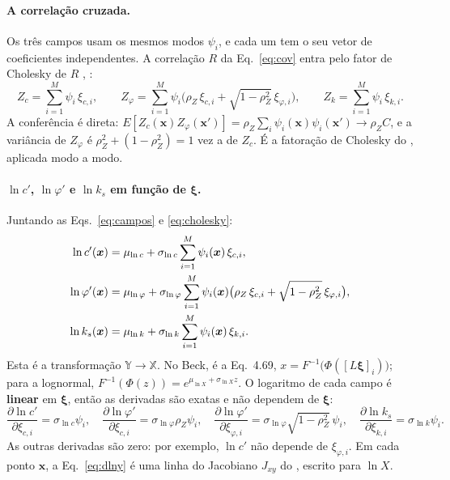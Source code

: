 \documentclass[11pt,a4paper]{article}
\newcommand{\X}{\mathbb{X}}
\newcommand{\Y}{\mathbb{Y}}
\newcommand{\xib}{\bm\xi}
\begin{document}
\paragraph{A correlação cruzada.} Os três campos usam os mesmos modos $\psi_i$, e cada um tem o seu vetor de
coeficientes independentes. A correlação $R$ da Eq.~\eqref{eq:cov} entra pelo fator de Cholesky de $R$
\citep[Eq.~11]{cho2010}, \citep{vorechovsky2008}:
\begin{equation}
  Z_c = \sum_{i=1}^M \psi_i\,\xi_{c,i}, \qquad
  Z_\varphi = \sum_{i=1}^M \psi_i\big(\rho_Z\,\xi_{c,i} + \sqrt{1 - \rho_Z^2}\,\xi_{\varphi,i}\big), \qquad
  Z_k = \sum_{i=1}^M \psi_i\,\xi_{k,i}.
  \label{eq:cholesky}
\end{equation}
A conferência é direta: $E[Z_c(\bm x)Z_\varphi(\bm x')] = \rho_Z\sum_i\psi_i(\bm x)\psi_i(\bm x') \to \rho_Z C$, e a
variância de $Z_\varphi$ é $\rho_Z^2 + (1 - \rho_Z^2) = 1$ vez a de $Z_c$. É a fatoração de Cholesky do
\citet[Eq.~4.66]{beck2014}, aplicada modo a modo.

\paragraph{$\ln c'$, $\ln\varphi'$ e $\ln k_s$ em função de $\xib$.} Juntando as Eqs.~\eqref{eq:campos} e
\eqref{eq:cholesky}:
\begin{align}
  \ln c'(\bm x) &= \mu_{\ln c} + \sigma_{\ln c} \sum_{i=1}^M \psi_i(\bm x)\,\xi_{c,i}, \notag\\
  \ln\varphi'(\bm x) &= \mu_{\ln\varphi} + \sigma_{\ln\varphi} \sum_{i=1}^M \psi_i(\bm x)\big(\rho_Z\,\xi_{c,i} +
    \sqrt{1 - \rho_Z^2}\,\xi_{\varphi,i}\big), \label{eq:lny}\\
  \ln k_s(\bm x) &= \mu_{\ln k} + \sigma_{\ln k} \sum_{i=1}^M \psi_i(\bm x)\,\xi_{k,i}. \notag
\end{align}
Esta é a transformação $\Y \to \X$. No Beck, é a Eq.~4.69, $x = F^{-1}\big(\Phi([L\xib]_i)\big)$; para a lognormal,
$F^{-1}(\Phi(z)) = e^{\mu_{\ln X} + \sigma_{\ln X} z}$. O logaritmo de cada campo é \textbf{linear} em $\xib$, então as derivadas são
exatas e não dependem de $\xib$:
\begin{equation}
  \frac{\partial\ln c'}{\partial \xi_{c,i}} = \sigma_{\ln c}\psi_i, \quad
  \frac{\partial\ln\varphi'}{\partial \xi_{c,i}} = \sigma_{\ln\varphi}\rho_Z\psi_i, \quad
  \frac{\partial\ln\varphi'}{\partial \xi_{\varphi,i}} = \sigma_{\ln\varphi}\sqrt{1 - \rho_Z^2}\,\psi_i, \quad
  \frac{\partial\ln k_s}{\partial \xi_{k,i}} = \sigma_{\ln k}\psi_i.
  \label{eq:dlny}
\end{equation}
As outras derivadas são zero: por exemplo, $\ln c'$ não depende de $\xi_{\varphi,i}$. Em cada ponto $\bm x$, a
Eq.~\eqref{eq:dlny} é uma linha do Jacobiano $J_{xy}$ do \citet[Eq.~4.33]{beck2014}, escrito para $\ln X$.
\end{document}
